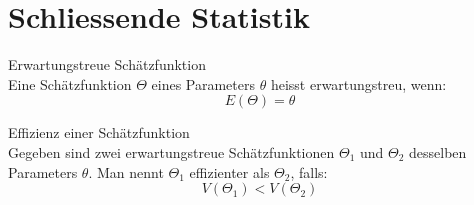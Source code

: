 \section{Schliessende Statistik}
\begin{definition}{Erwartungstreue Schätzfunktion}\\
Eine Schätzfunktion $\Theta$ eines Parameters $\theta$ heisst erwartungstreu, wenn:
$$
E(\Theta)=\theta
$$
\end{definition}

\begin{definition}{Effizienz einer Schätzfunktion}\\
Gegeben sind zwei erwartungstreue Schätzfunktionen $\Theta_1$ und $\Theta_2$ desselben Parameters $\theta$. Man nennt $\Theta_1$ effizienter als $\Theta_2$, falls:
$$
V(\Theta_1)<V(\Theta_2)
$$
\end{definition}

